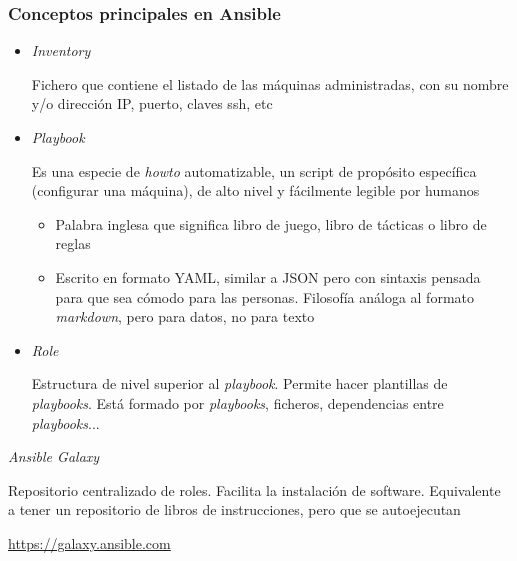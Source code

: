 \documentclass[ucs]{beamer}
\begin{document}
\begin{frame}[fragile]
\frametitle{Conceptos principales en Ansible}

\begin{itemize}
\item
\emph{Inventory}

Fichero que contiene el listado de las máquinas administradas,
con su nombre y/o dirección IP, puerto, claves ssh, etc

\item
\emph{Playbook}

Es una especie de \emph{howto} automatizable, un script de propósito
específica (configurar una máquina), de  alto 
nivel y fácilmente legible por humanos

\begin{itemize}
\item
Palabra inglesa que significa 
libro de juego, libro de tácticas o libro de reglas

\item
Escrito en formato YAML, similar a JSON pero con sintaxis pensada
para que sea cómodo para las personas. Filosofía análoga
al formato 
\emph{markdown}, pero para datos, no para texto
\end{itemize}

\item
\emph{Role}

Estructura de nivel superior al
\emph{playbook}.
Permite hacer plantillas de \emph{playbooks}.
Está formado por
\emph{playbooks}, ficheros,
dependencias entre
\emph{playbooks}...


\end{itemize}
\end{frame}
\begin{frame}[fragile]

\emph{Ansible Galaxy}

Repositorio centralizado de roles.
Facilita la instalación de software. Equivalente a tener
un repositorio de libros de instrucciones, pero que se autoejecutan


\url{https://galaxy.ansible.com}
\end{frame}
\end{document}
